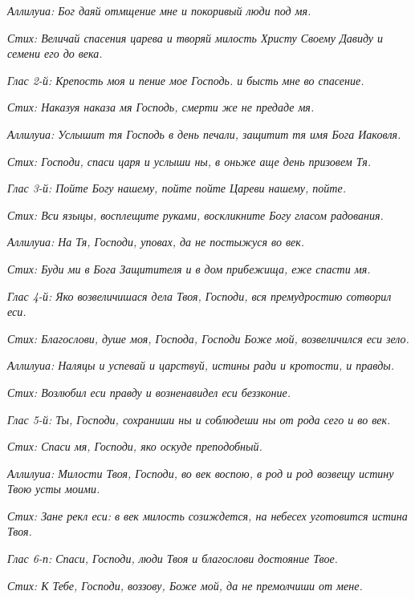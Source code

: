 \itshape Аллилуиа:\normalfont{} Бог даяй отмщение мне и покоривый люди под мя.


\itshape Стих:\normalfont{} Величай спасения царева и творяй милость Христу Своему Давиду и семени его до века.


\itshape Глас 2-й:\normalfont{} Крепость моя и пение мое Господь. и бысть мне во спасение.


\itshape Стих:\normalfont{} Наказуя наказа мя Господь, смерти же не предаде мя.


\itshape Аллилуиа:\normalfont{} Услышит тя Господь в день печали, защитит тя имя Бога Иаковля.


\itshape Стих:\normalfont{} Господи, спаси царя и услыши ны, в оньже аще день призовем Тя.


\itshape Глас 3-й:\normalfont{} Пойте Богу нашему, пойте пойте Цареви нашему, пойте.


\itshape Стих:\normalfont{} Вси языцы, восплещите руками, воскликните Богу гласом радования.


\itshape Аллилуиа:\normalfont{} На Тя, Господи, уповах, да не постыжуся во век.


\itshape Стих:\normalfont{} Буди ми в Бога Защитителя и в дом прибежища, еже спасти мя.


\itshape Глас 4-й:\normalfont{} Яко возвеличишася дела Твоя, Господи, вся премудростию сотворил еси.


\itshape Стих:\normalfont{} Благослови, душе моя, Господа, Господи Боже мой, возвеличился еси зело.


\itshape Аллилуиа:\normalfont{} Наляцы и успевай и царствуй, истины ради и кротости, и правды.


\itshape Стих:\normalfont{} Возлюбил еси правду и возненавидел еси беззконие.


\itshape Глас 5-й:\normalfont{} Ты, Господи, сохраниши ны и соблюдеши ны от рода сего и во век.


\itshape Стих:\normalfont{} Спаси мя, Господи, яко оскуде преподобный.


\itshape Аллилуиа:\normalfont{} Милости Твоя, Господи, во век воспою, в род и род возвещу истину Твою усты моими.


\itshape Стих:\normalfont{} Зане рекл еси: в век милость созиждется, на небесех уготовится истина Твоя.


\itshape Глас 6-п:\normalfont{} Спаси, Господи, люди Твоя и благослови достояние Твое.


\itshape Стих:\normalfont{} К Тебе, Господи, воззову, Боже мой, да не премолчиши от мене.



